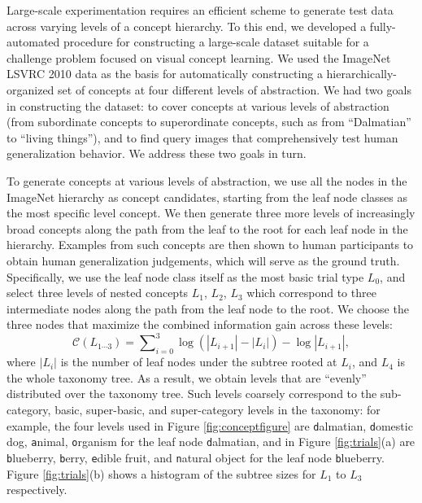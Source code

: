 Large-scale experimentation requires an efficient scheme to generate test data across varying levels of a concept hierarchy. To this end, we developed a fully-automated procedure for constructing a large-scale dataset suitable for a challenge problem focused on visual concept learning. We used the ImageNet LSVRC \cite{ilsvrc} 2010 data as the basis for automatically constructing a hierarchically-organized set of concepts at four different levels of abstraction. We had two goals in constructing the dataset: to cover concepts at various levels of abstraction (from subordinate concepts to superordinate concepts, such as from “Dalmatian” to “living things”), and to find query images that comprehensively test human generalization behavior. We address these two goals in turn.

To generate concepts at various levels of abstraction, we use all the nodes in the ImageNet hierarchy as concept candidates, starting from the leaf node classes as the most specific level concept. We then generate three more levels of increasingly broad concepts along the path from the leaf to the root for each leaf node in the hierarchy. Examples from such concepts are then shown to human participants to obtain human generalization judgements, which will serve as the ground truth. Specifically, we use the leaf node class itself as the most basic trial type $L_0$, and select three levels of nested concepts $L_1$, $L_2$, $L_3$ which correspond to three intermediate nodes along the path from the leaf node to the root. We choose the three nodes that maximize the combined information gain across these levels:
\begin{equation}
    \mathcal{C}(L_{1\cdots 3}) = \sum\nolimits_{i=0}^{3} \log(|L_{i+1}| - |L_{i}|) - \log|L_{i+1}|,
\end{equation}
where $|L_i|$ is the number of leaf nodes under the subtree rooted at $L_i$, and $L_4$ is the whole taxonomy tree. As a result, we obtain levels that are ``evenly'' distributed over the taxonomy tree. Such levels coarsely correspond to the sub-category, basic, super-basic, and super-category levels in the taxonomy: for example, the four levels used in Figure \ref{fig:conceptfigure} are {\texttt dalmatian}, {\texttt domestic dog}, {\texttt animal}, {\texttt organism} for the leaf node {\texttt dalmatian}, and in Figure \ref{fig:trials}(a) are {\texttt blueberry}, {\texttt berry}, {\texttt edible fruit}, and {\texttt natural object} for the leaf node {\texttt blueberry}. Figure \ref{fig:trials}(b) shows a histogram of the subtree sizes for $L_1$ to $L_3$ respectively. 

